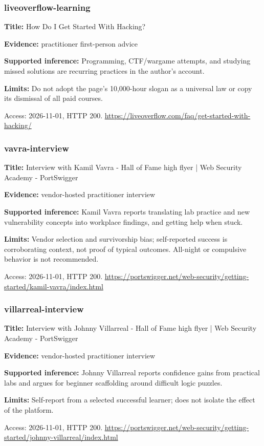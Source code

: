 \subsubsection{liveoverflow-learning}
\noindent\textbf{Title:} How Do I Get Started With Hacking?\par
\noindent\textbf{Evidence:} practitioner first-person advice\par
\noindent\textbf{Supported inference:} Programming, CTF/wargame attempts, and studying missed solutions are recurring practices in the author’s account.\par
\noindent\textbf{Limits:} Do not adopt the page’s 10,000-hour slogan as a universal law or copy its dismissal of all paid courses.\par
\noindent Access: 2026-11-01, HTTP 200. \url{https://liveoverflow.com/faq/get-started-with-hacking/}
\subsubsection{vavra-interview}
\noindent\textbf{Title:} Interview with Kamil Vavra - Hall of Fame high flyer | Web Security Academy - PortSwigger\par
\noindent\textbf{Evidence:} vendor-hosted practitioner interview\par
\noindent\textbf{Supported inference:} Kamil Vavra reports translating lab practice and new vulnerability concepts into workplace findings, and getting help when stuck.\par
\noindent\textbf{Limits:} Vendor selection and survivorship bias; self-reported success is corroborating context, not proof of typical outcomes. All-night or compulsive behavior is not recommended.\par
\noindent Access: 2026-11-01, HTTP 200. \url{https://portswigger.net/web-security/getting-started/kamil-vavra/index.html}
\subsubsection{villarreal-interview}
\noindent\textbf{Title:} Interview with Johnny Villarreal - Hall of Fame high flyer | Web Security Academy - PortSwigger\par
\noindent\textbf{Evidence:} vendor-hosted practitioner interview\par
\noindent\textbf{Supported inference:} Johnny Villarreal reports confidence gains from practical labs and argues for beginner scaffolding around difficult logic puzzles.\par
\noindent\textbf{Limits:} Self-report from a selected successful learner; does not isolate the effect of the platform.\par
\noindent Access: 2026-11-01, HTTP 200. \url{https://portswigger.net/web-security/getting-started/johnny-villarreal/index.html}
